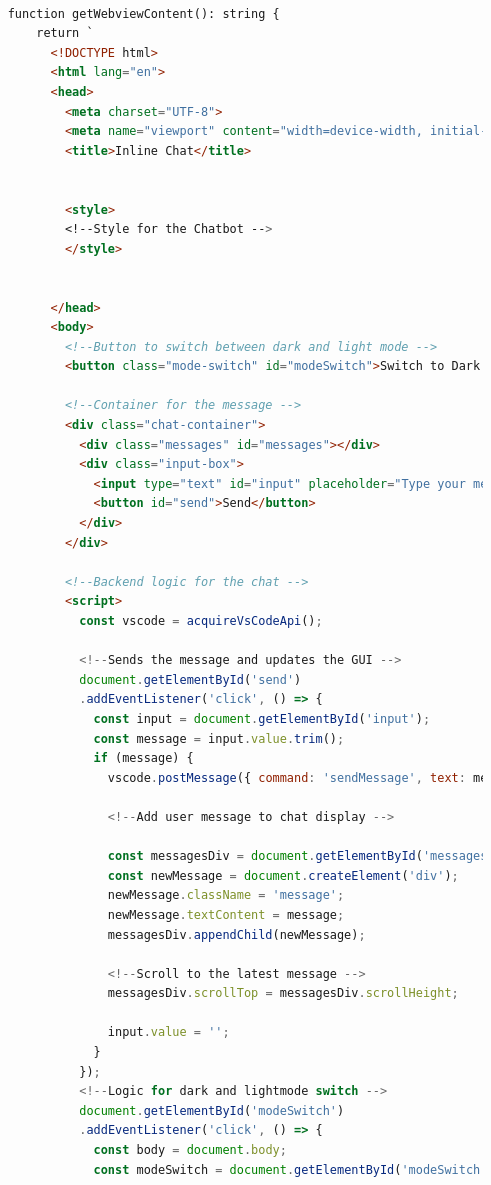 \begin{lstlisting}[language=HTML, caption={IDE Chat GUI}]

    function getWebviewContent(): string {
        return `
          <!DOCTYPE html>
          <html lang="en">
          <head>
            <meta charset="UTF-8">
            <meta name="viewport" content="width=device-width, initial-scale=1.0">
            <title>Inline Chat</title>


            <style>
            <!--Style for the Chatbot -->
            </style>


          </head>
          <body>
            <!--Button to switch between dark and light mode -->
            <button class="mode-switch" id="modeSwitch">Switch to Dark Mode</button>

            <!--Container for the message -->
            <div class="chat-container">
              <div class="messages" id="messages"></div>
              <div class="input-box">
                <input type="text" id="input" placeholder="Type your message..." />
                <button id="send">Send</button>
              </div>
            </div>

            <!--Backend logic for the chat -->
            <script>
              const vscode = acquireVsCodeApi();

              <!--Sends the message and updates the GUI -->
              document.getElementById('send')
              .addEventListener('click', () => {
                const input = document.getElementById('input');
                const message = input.value.trim();
                if (message) {
                  vscode.postMessage({ command: 'sendMessage', text: message });
      
                  <!--Add user message to chat display -->
                  
                  const messagesDiv = document.getElementById('messages');
                  const newMessage = document.createElement('div');
                  newMessage.className = 'message';
                  newMessage.textContent = message;
                  messagesDiv.appendChild(newMessage);
      
                  <!--Scroll to the latest message -->
                  messagesDiv.scrollTop = messagesDiv.scrollHeight;
      
                  input.value = '';
                }
              });
              <!--Logic for dark and lightmode switch -->
              document.getElementById('modeSwitch')
              .addEventListener('click', () => {
                const body = document.body;
                const modeSwitch = document.getElementById('modeSwitch');
      

\end{lstlisting}
